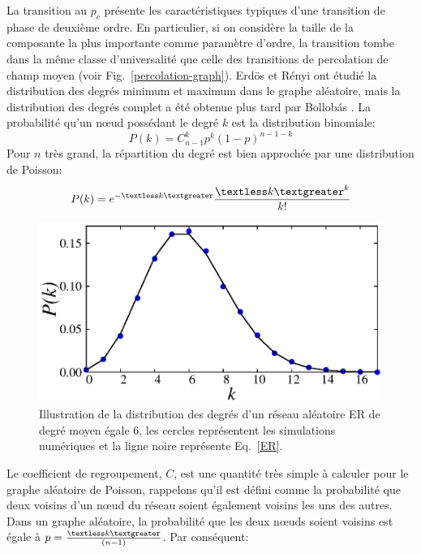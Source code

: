 La transition au $p_c$ présente les caractéristiques typiques d'une transition de phase de deuxième ordre. En particulier, si on considère la taille de la composante la plus importante comme paramètre d'ordre, la transition tombe dans la même classe d'universalité que celle des transitions de percolation de champ moyen (voir Fig.~\ref{percolation-graph}). Erdös et Rényi ont étudié la distribution des degrés minimum et maximum dans le graphe aléatoire, mais la distribution des degrés complet a été obtenue plus tard par Bollobás \cite{Bollobas1998}. La probabilité qu'un nœud possédant le degré  $k$ est la distribution binomiale:
\begin{equation}
P(k)=C^k_{n-1}p^k(1-p)^{n-1-k}
\end{equation}
 Pour $n$ très grand, la répartition du degré est bien approchée par une distribution de Poisson:
 \begin{equation}
 P(k)=e^{-\textless k\textgreater}\dfrac{\textless k\textgreater^k}{k!}
 \label{ER}
 \end{equation}
\begin{figure}[h!]
	\centering
	\includegraphics[scale=1]{./figures/fig-ER-dist}
	\caption{Illustration de la distribution des degrés d'un réseau aléatoire ER de degré moyen égale $6$, les cercles représentent les simulations numériques et la ligne noire représente Eq.~\eqref{ER}.}
	
	\label{ER-distribution}
\end{figure} 

 Le coefficient de regroupement, $C$, est une quantité très simple à calculer pour le graphe aléatoire de Poisson, rappelons qu'il est défini comme la probabilité que deux voisins d'un nœud du réseau soient également voisins les uns des autres. Dans un graphe aléatoire, la probabilité que les deux nœuds soient voisins est égale à $p=\frac{\textless k\textgreater}{(n - 1)}$. Par conséquent:
 
